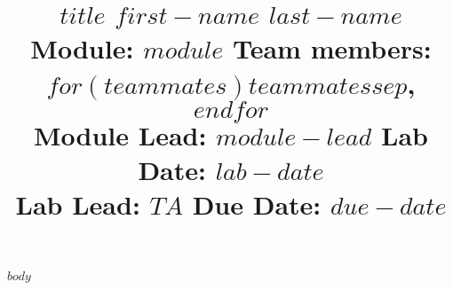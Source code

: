 \documentclass{article}
\title{
\noindent
\large\textbf{$title$} \hfill \textbf{$first-name$ $last-name$} \\
\normalsize Module: $module$ \hfill Team members: $for(teammates)$$teammates$$sep$, $endfor$ \\
Module Lead: $module-lead$ \hfill Lab Date: $lab-date$ \\
Lab Lead: $TA$ \hfill Due Date: $due-date$
}
\date{\vspace{-5ex}}
\begin{document}
$body$
\end{document}
